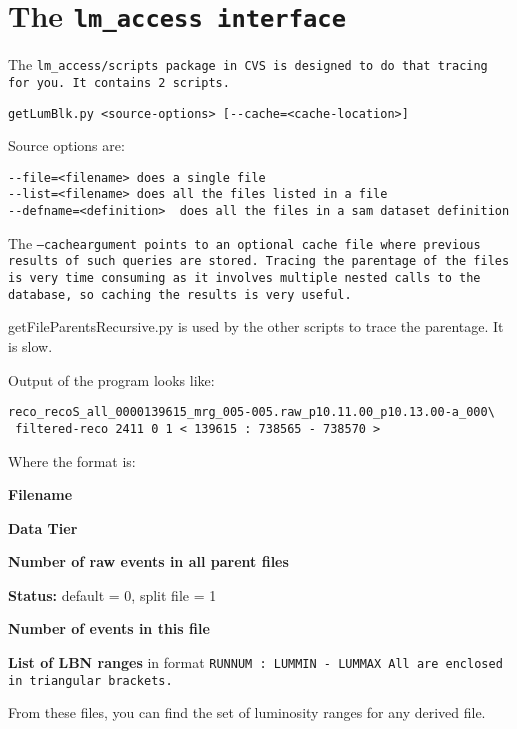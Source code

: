 \documentclass[12pt]{article}
\begin{document}
\section{The \tt lm\_access \rm interface}

The \tt lm\_access/scripts \rm package in CVS is designed to do
that tracing for you.  It contains 2 scripts.


\begin{verbatim}
getLumBlk.py <source-options> [--cache=<cache-location>]
\end{verbatim}

Source options are:

\begin{verbatim}
--file=<filename> does a single file
--list=<filename> does all the files listed in a file
--defname=<definition>  does all the files in a sam dataset definition
\end{verbatim}

The \tt--cache\rm  argument points to an optional cache file where previous results of
such queries are stored. Tracing the parentage of the files is very time consuming
as it involves multiple nested calls to the database, so caching the results is very useful.

getFileParentsRecursive.py is used by the other scripts to trace the parentage.  It is slow.


Output of the program looks like:

\begin{verbatim}
reco_recoS_all_0000139615_mrg_005-005.raw_p10.11.00_p10.13.00-a_000\
 filtered-reco 2411 0 1 < 139615 : 738565 - 738570 >
\end{verbatim}

Where the format is:
\begin{description}
\item{\bf Filename}
\item{\bf Data Tier}
\item{\bf Number of raw events in all parent files}
\item{\bf Status:} default = 0, split file = 1
\item{\bf Number of events in this file}
\item{\bf List of LBN ranges} in format \tt RUNNUM : LUMMIN - LUMMAX \rm\break
All are enclosed in triangular brackets.
\end{description}

From these files, you can find the set of luminosity ranges for any derived file.
\end{document}
